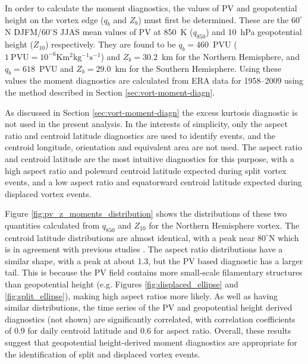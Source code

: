 In order to calculate the moment diagnostics, the values of PV and geopotential
height on the vortex edge ($q_b$ and $Z_b$) must first be determined. These are
the $60^{\circ}$N DJFM/$60^{\circ}$S JJAS mean values of PV at 850~K ($q_{850}$)
and 10~hPa geopotential height ($Z_{10}$) respectively. They are found to be
$q_b = 460$~PVU ($\mathrm{1~PVU = 10^{-6}Km^2kg^{-1}s^{-1}}$) and
$Z_b = 30.2$~km for the Northern Hemisphere, and $q_b = 618$~PVU and
$Z_b = 29.0$~km for the Southern Hemisphere. Using these values the moment
diagnostics are calculated from ERA data for 1958--2009 using the method
described in Section \ref{sec:vort-moment-diagn}.

As discussed in Section \ref{sec:vort-moment-diagn} the excess kurtosis
diagnostic is not used in the present analysis. In the interests of simplicity,
only the aspect ratio and centroid latitude diagnostics are used to identify
events, and the centroid longitude, orientation and equivalent area are not
used. The aspect ratio and centroid latitude are the most intuitive diagnostics
for this purpose, with a high aspect ratio and poleward centroid latitude
expected during split vortex events, and a low aspect ratio and equatorward
centroid latitude expected during displaced vortex events. 

Figure \ref{fig:pv_z_moments_distribution} shows the distributions of these two
quantities calculated from $q_{850}$ and $Z_{10}$ for the Northern Hemisphere
vortex. The centroid latitude distributions are almost identical, with a peak
near $80^{\circ}$N which is in agreement with previous studies
\citep{Waugh1999,Mitchell2011}. The aspect ratio distributions have a similar
shape, with a peak at about 1.3, but the PV based diagnostic has a larger
tail. This is because the PV field contains more small-scale filamentary
structures than geopotential height (e.g. Figures \ref{fig:displaced_ellipse}
and \ref{fig:split_ellipse}), making high aspect ratios more likely. As well as
having similar distributions, the time series of the PV and geopotential height
derived diagnostics (not shown) are significantly correlated, with correlation
coefficients of 0.9 for daily centroid latitude and 0.6 for aspect
ratio. Overall, these results suggest that geopotential height-derived moment
diagnostics are appropriate for the identification of split and displaced vortex
events.


